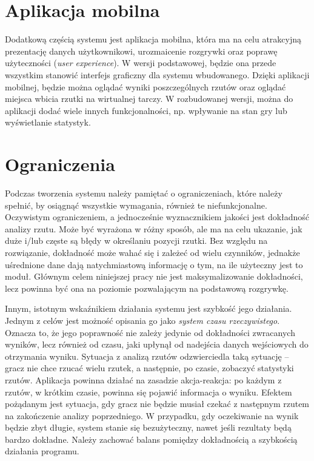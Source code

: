 \section{Aplikacja mobilna}
Dodatkową częścią systemu jest aplikacja mobilna, która ma na celu atrakcyjną prezentację danych użytkownikowi, urozmaicenie rozgrywki oraz poprawę użyteczności (\textit{user experience}). W wersji podstawowej, będzie ona przede wszystkim stanowić interfejs graficzny dla systemu wbudowanego. Dzięki aplikacji mobilnej, będzie można oglądać wyniki poszczególnych rzutów oraz oglądać miejsca wbicia rzutki na wirtualnej tarczy. W rozbudowanej wersji, można do aplikacji dodać wiele innych funkcjonalności, np. wpływanie na stan gry lub wyświetlanie statystyk. 
 
\section{Ograniczenia}
Podczas tworzenia systemu należy pamiętać o ograniczeniach, które należy spełnić, by osiągnąć wszystkie wymagania, również te niefunkcjonalne. Oczywistym ograniczeniem, a jednocześnie wyznacznikiem jakości jest dokładność analizy rzutu. Może być wyrażona w różny sposób, ale ma na celu ukazanie, jak duże i/lub częste są błędy w określaniu pozycji rzutki. Bez względu na rozwiązanie, dokładność może wahać się i zależeć od wielu czynników, jednakże uśrednione dane dają natychmiastową informację o tym, na ile użyteczny jest to moduł. Głównym celem niniejszej pracy nie jest maksymalizowanie dokładności, lecz powinna być ona na poziomie pozwalającym na podstawową rozgrywkę.  

Innym, istotnym wskaźnikiem działania systemu jest szybkość jego działania. Jednym z celów jest możność opisania go jako \textit{system czasu rzeczywistego}. Oznacza to, że jego poprawność nie zależy jedynie od dokładności zwracanych wyników, lecz również od czasu, jaki upłynął od nadejścia danych wejściowych do otrzymania wyniku. Sytuacja z analizą rzutów odzwierciedla taką sytuację -- gracz nie chce rzucać wielu rzutek, a następnie, po czasie, zobaczyć statystyki rzutów. Aplikacja powinna działać na zasadzie akcja-reakcja: po każdym z rzutów, w krótkim czasie, powinna się pojawić informacja o wyniku. Efektem pożądanym jest sytuacja, gdy gracz nie będzie musiał czekać z następnym rzutem na zakończenie analizy poprzedniego. W przypadku, gdy oczekiwanie na wynik będzie zbyt długie, system stanie się bezużyteczny, nawet jeśli rezultaty będą bardzo dokładne. Należy zachować balans pomiędzy dokładnością a szybkością działania programu.

